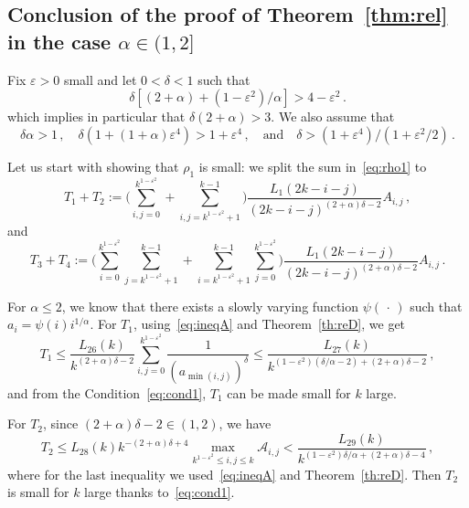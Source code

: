 \documentclass[AHL,Unicode,longabstracts]{cedram}
\newcommand{\ga}{\alpha}
\newcommand{\gd}{\delta}
\newcommand{\gep}{\varepsilon}
\newcommand{\cA}{\ensuremath{\mathcal{A}}}
\begin{document}
\subsection{Conclusion of the proof of Theorem~\ref{thm:rel} in the case \texorpdfstring{$\ga\in(1,2]$}{ga in(1,2]}}\label{sec:ga1}

Fix $\gep >0$ small and let $0 < \delta <1$ such that
\begin{equation}\label{eq:cond1}
\delta \left[(2+\ga) + (1-\gep^2)/\ga \right] > 4 - \gep^2\,.
\end{equation}
which implies in particular that $\delta (2+\ga) > 3$. We also assume that
\begin{equation}\label{eq:cond2}
\gd\ga >1\,, \quad \gd (1+(1+\ga) \gep^4 ) > 1+\gep^4\,, \quad \text{and}\quad \gd>(1+\gep^4)/(1+\gep^2/2)\,.
\end{equation}



Let us start with showing that $\rho_1$ is small: we split the sum in~\eqref{eq:rho1} to
\begin{equation}
T_1 + T_2 := \bigg(\sum_{i,j=0}^{ k^{1- \gep^2} } + \sum_{i,j= k^{1- \gep^2} + 1}^{k-1} \bigg) \frac{L_1(2 k -i-j) }{(2k -i-j)^{(2+\ga)\delta -2}} A_{i,j}\,,
\end{equation}
and
\begin{equation}
T_3 + T_4 := \bigg(\sum_{i=0}^{ k^{1- \gep^2} } \sum_{j= k^{1- \gep^2} + 1}^{k-1} + \sum_{i= k^{1- \gep^2} + 1}^{k-1} \sum_{j=0}^{ k^{1- \gep^2} } \bigg) \frac{L_1(2 k -i-j)}{(2k -i-j)^{(2+\ga)\delta -2}} A_{i,j}\,.
\end{equation}



For $\ga\leq 2$, we know that there exists a slowly varying function $\psi({\,\cdot\,})$ such that $a_i = \psi(i) i^{1/\ga}$. For $T_1$, using~\eqref{eq:ineqA} and Theorem~\ref{th:reD}, we get
\begin{equation}
T_1 \le \frac{L_{26}(k)}{k^{(2+\ga) \delta - 2}} \sum_{i,j =0}^{k^{1-\gep^2}} \frac{1}{(a_{\min(i,j)})^\gd} \leq \frac{L_{27}(k)}{k^{(1-\gep^2) (\delta/\ga - 2) +(2+\ga) \delta - 2}}\,,
\end{equation}
and from the Condition~\eqref{eq:cond1}, $T_1$ can be made small for $k$ large.


For $T_2$, since $(2+\ga)\gd-2 \in(1,2)$, we have
\begin{equation}
T_2 \le L_{28}(k) k^{-(2+\ga)\gd + 4} \max_{k^{1-\gep^2} \le i,j \le k} \cA_{i,j} < \frac{L_{29}(k)}{k^{(1- \gep^2)\delta/\ga +(2+\ga)\gd-4}}\,,
\end{equation}
where for the last inequality we used~\eqref{eq:ineqA} and Theorem~\ref{th:reD}. Then $T_2$ is small for $k$ large thanks to~\eqref{eq:cond1}.
\end{document}
